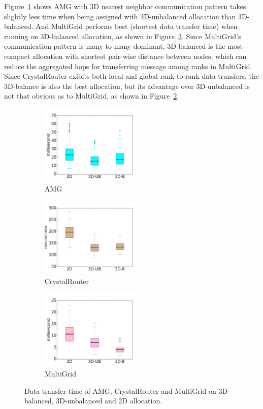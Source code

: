 Figure~\ref{fig:shapstudy-amg} shows 
AMG with 3D nearest neighbor communication pattern takes slightly less time 
when being assigned with 3D-unbalanced allocation than 3D-balanced. 
And MultiGrid performs best (shortest data transfer time) 
when running on 3D-balanced allocation, as shown in Figure~\ref{fig:shapstudy-mg}. 
Since MultiGrid's communication pattern is many-to-many dominant, 
3D-balanced is the most compact allocation with shortest pair-wise distance between nodes, 
which can reduce the aggregated hops for transferring message among ranks in MultiGrid. 
Since CrystalRouter exibits both local and global rank-to-rank data transfers, 
the 3D-balance is also the best allocation, but its advantage over 3D-unbalanced is not 
that obvious as to MultiGrid, as shown in Figure~\ref{fig:shapstudy-cr}.


\begin{figure}[htp]
    \centering
    \begin{subfigure}[t]{0.32\textwidth}
        \centering
        \includegraphics[height=1.5in]{figs/intra-job/shapestudy/amg_box}
        \caption{AMG}
        \label{fig:shapstudy-amg}
    \end{subfigure}%
    \hspace{1em}%
    \begin{subfigure}[t]{0.32\textwidth}
        \centering
        \includegraphics[height=1.5in]{figs/intra-job/shapestudy/cr_box}
        \caption{CrystalRouter}
        \label{fig:shapstudy-cr}
    \end{subfigure}%
    \begin{subfigure}[t]{0.32\textwidth}
        \centering
        \includegraphics[height=1.5in]{figs/intra-job/shapestudy/mg_box}
        \caption{MultiGrid}
        \label{fig:shapstudy-mg}
    \end{subfigure}%
   \caption{
   Data transfer time of AMG, CrystalRouter and MultiGrid on 3D-balanced, 
   3D-unbalanced and 2D allocation.
   }
   \label{fig:shapestudy}
\end{figure}

